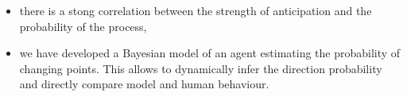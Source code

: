 \documentclass[profile,final,english, draft]{sciposter}%
\begin{document}
\begin{multicols}{3}
\begin{itemize}
\item there is a stong correlation between the strength of anticipation and the probability of the process,

\item we have developed a Bayesian model of an agent estimating the probability of changing points. This allows to dynamically infer the direction probability and directly compare model and human behaviour.

\end{itemize}

{\tiny
\printbibliography
}


\end{multicols}


\end{document}
